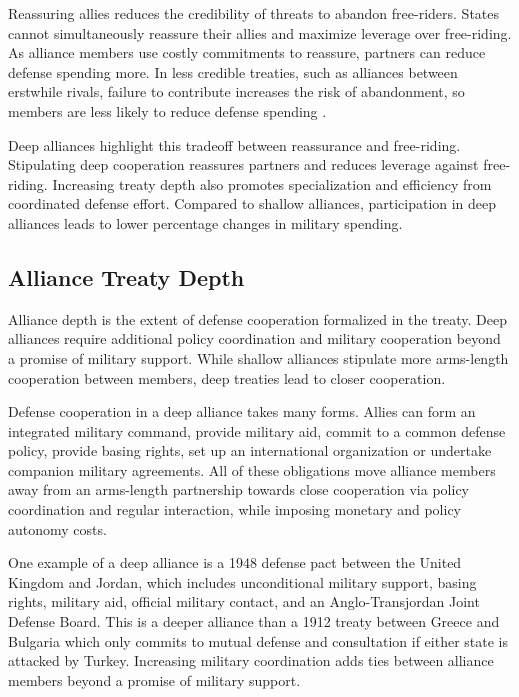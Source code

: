 \documentclass[12pt]{article}
\begin{document}
Reassuring allies reduces the credibility of threats to abandon free-riders. 
States cannot simultaneously reassure their allies and maximize leverage over free-riding. 
As alliance members use costly commitments to reassure, partners can reduce defense spending more. 
In less credible treaties, such as alliances between erstwhile rivals, failure to contribute increases the risk of abandonment, so members are less likely to reduce defense spending \citep{NiouZeigler2019}. 


Deep alliances highlight this tradeoff between reassurance and free-riding. 
Stipulating deep cooperation reassures partners and reduces leverage against free-riding. 
Increasing treaty depth also promotes specialization and efficiency from coordinated defense effort.
Compared to shallow alliances, participation in deep alliances leads to lower percentage changes in military spending. 



\subsection*{Alliance Treaty Depth} 


Alliance depth is the extent of defense cooperation formalized in the treaty. 
Deep alliances require additional policy coordination and military cooperation beyond a promise of military support. 
While shallow alliances stipulate more arms-length cooperation between members, deep treaties lead to closer cooperation. 


Defense cooperation in a deep alliance takes many forms. 
Allies can form an integrated military command, provide military aid, commit to a common defense policy, provide basing rights, set up an international organization or undertake companion military agreements. 
All of these obligations move alliance members away from an arms-length partnership towards close cooperation via policy coordination and regular interaction, while imposing monetary and policy autonomy costs. 

 
One example of a deep alliance is a 1948 defense pact between the United Kingdom and Jordan, which includes unconditional military support, basing rights, military aid, official military contact, and an Anglo-Transjordan Joint Defense Board.  
This is a deeper alliance than a 1912 treaty between Greece and Bulgaria which only commits to mutual defense and consultation if either state is attacked by Turkey. 
Increasing military coordination adds ties between alliance members beyond a promise of military support.
\end{document}
